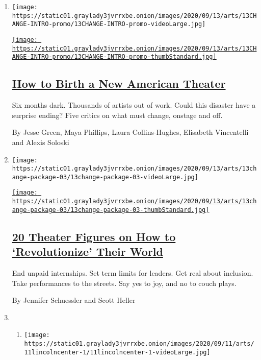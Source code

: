 \begin{enumerate}
\def\labelenumi{\arabic{enumi}.}
\item
  \texttt{[image: https://static01.graylady3jvrrxbe.onion/images/2020/09/13/arts/13CHANGE-INTRO-promo/13CHANGE-INTRO-promo-videoLarge.jpg]}

  \href{/2020/09/11/theater/how-to-change-theater.html}{\texttt{[image: https://static01.graylady3jvrrxbe.onion/images/2020/09/13/arts/13CHANGE-INTRO-promo/13CHANGE-INTRO-promo-thumbStandard.jpg]}}

  \hypertarget{how-to-birth-a-new-american-theater}{%
  \subsection{\texorpdfstring{\href{/2020/09/11/theater/how-to-change-theater.html}{How
  to Birth a New American
  Theater}}{How to Birth a New American Theater}}\label{how-to-birth-a-new-american-theater}}

  Six months dark. Thousands of artists out of work. Could this disaster
  have a surprise ending? Five critics on what must change, onstage and
  off.

  By Jesse Green, Maya Phillips, Laura Collins-Hughes, Elisabeth
  Vincentelli and Alexis Soloski
\item
  \texttt{[image: https://static01.graylady3jvrrxbe.onion/images/2020/09/13/arts/13change-package-03/13change-package-03-videoLarge.jpg]}

  \href{/2020/09/11/theater/how-to-revolutionize-theater.html}{\texttt{[image: https://static01.graylady3jvrrxbe.onion/images/2020/09/13/arts/13change-package-03/13change-package-03-thumbStandard.jpg]}}

  \hypertarget{20-theater-figures-on-how-to-revolutionize-their-world}{%
  \subsection{\texorpdfstring{\href{/2020/09/11/theater/how-to-revolutionize-theater.html}{20
  Theater Figures on How to `Revolutionize' Their
  World}}{20 Theater Figures on How to `Revolutionize' Their World}}\label{20-theater-figures-on-how-to-revolutionize-their-world}}

  End unpaid internships. Set term limits for leaders. Get real about
  inclusion. Take performances to the streets. Say yes to joy, and no to
  couch plays.

  By Jennifer Schuessler and Scott Heller
\item
  \begin{enumerate}
  \def\labelenumii{\arabic{enumii}.}
  \item
    \texttt{[image: https://static01.graylady3jvrrxbe.onion/images/2020/09/11/arts/11lincolncenter-1/11lincolncenter-1-videoLarge.jpg]}


\end{enumerate}
\end{enumerate}
